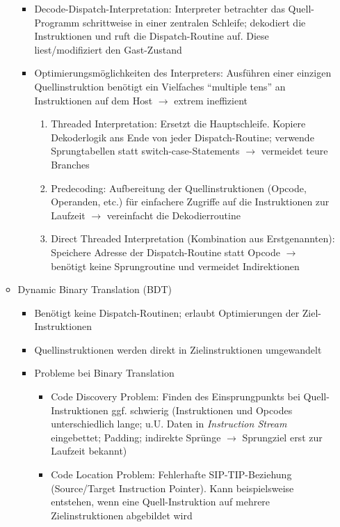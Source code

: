 \begin{itemize}
\begin{itemize}
		\begin{itemize}
			\item Decode-Dispatch-Interpretation: Interpreter betrachter das Quell-Programm schrittweise in einer zentralen Schleife; dekodiert die Instruktionen und ruft die Dispatch-Routine auf. Diese liest/modifiziert den Gast-Zustand
			\item Optimierungsmöglichkeiten des Interpreters: Ausführen einer einzigen Quellinstruktion benötigt ein Vielfaches "`multiple tens"' an Instruktionen auf dem Host \(\rightarrow\) extrem ineffizient
			\begin{enumerate} %
				\item Threaded Interpretation: Ersetzt die Hauptschleife. Kopiere Dekoderlogik ans Ende von jeder Dispatch-Routine; verwende Sprungtabellen statt switch-case-Statements \(\rightarrow\) vermeidet teure Branches
				\item Predecoding: Aufbereitung der Quellinstruktionen (Opcode, Operanden, etc.) für einfachere Zugriffe auf die Instruktionen zur Laufzeit \(\rightarrow\) vereinfacht die Dekodierroutine
				\item Direct Threaded Interpretation (Kombination aus Erstgenannten): Speichere Adresse der Dispatch-Routine statt Opcode \(\rightarrow\) benötigt keine Sprungroutine und vermeidet Indirektionen 
			\end{enumerate}
		\end{itemize}
		\item Dynamic Binary Translation (BDT)
		\begin{itemize}
			\item Benötigt keine Dispatch-Routinen; erlaubt Optimierungen der Ziel-Instruktionen
			\item Quellinstruktionen werden direkt in Zielinstruktionen umgewandelt
			\item Probleme bei Binary Translation
			\begin{itemize}
				\item Code Discovery Problem: Finden des Einsprungpunkts bei Quell-Instruktionen ggf. schwierig (Instruktionen und Opcodes unterschiedlich lange; u.U. Daten in \textit{Instruction Stream} eingebettet; Padding; indirekte Sprünge \(\rightarrow\) Sprungziel erst zur Laufzeit bekannt)
				\item Code Location Problem: Fehlerhafte SIP-TIP-Beziehung (Source/Target Instruction Pointer). Kann beispielsweise entstehen, wenn eine Quell-Instruktion auf mehrere Zielinstruktionen abgebildet wird
			\end{itemize}

\end{itemize}
\end{itemize}
\end{itemize}
